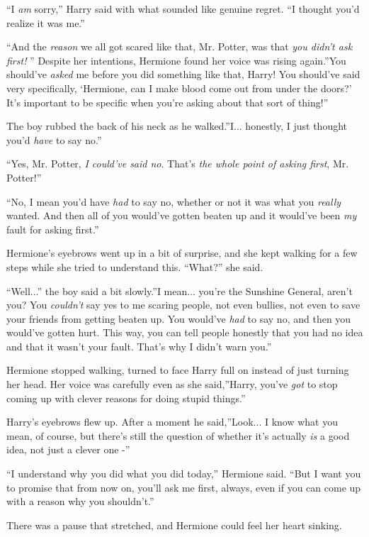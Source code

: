 ``I \emph{am} sorry,'' Harry said with what sounded like genuine regret.
``I thought you'd realize it was me.''

``And the \emph{reason} we all got scared like that, Mr. Potter, was that
\emph{you didn't ask first!} '' Despite her intentions, Hermione found
her voice was rising again.''You should've \emph{asked} me before you
did something like that, Harry! You should've said very specifically,
`Hermione, can I make blood come out from under the doors?' It's
important to be specific when you're asking about that sort of thing!''

The boy rubbed the back of his neck as he walked.''I... honestly, I
just thought you'd \emph{have} to say no.''

``Yes, Mr. Potter, \emph{I could've said no}. That's \emph{the whole
point of asking first}, Mr. Potter!''

``No, I mean you'd have \emph{had} to say no, whether or not it was what
you \emph{really} wanted. And then all of you would've gotten beaten up
and it would've been \emph{my} fault for asking first.''

Hermione's eyebrows went up in a bit of surprise, and she kept walking
for a few steps while she tried to understand this. ``What?'' she said.

``Well...'' the boy said a bit slowly.''I mean... you're the
Sunshine General, aren't you? You \emph{couldn't} say yes to me scaring
people, not even bullies, not even to save your friends from getting
beaten up. You would've \emph{had} to say no, and then you would've
gotten hurt. This way, you can tell people honestly that you had no idea
and that it wasn't your fault. That's why I didn't warn you.''

Hermione stopped walking, turned to face Harry full on instead of just
turning her head. Her voice was carefully even as she said,''Harry,
you've \emph{got} to stop coming up with clever reasons for doing stupid
things.''

Harry's eyebrows flew up. After a moment he said,''Look... I know
what you mean, of course, but there's still the question of whether it's
actually \emph{is} a good idea, not just a clever one -''

``I understand why you did what you did today,'' Hermione said. ``But I
want you to promise that from now on, you'll ask me first, always, even
if you can come up with a reason why you shouldn't.''

There was a pause that stretched, and Hermione could feel her heart
sinking.

